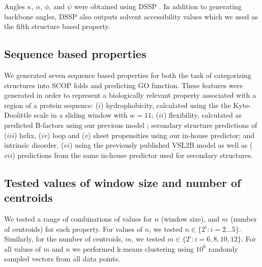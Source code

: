 Angles $\kappa$, $\alpha$, $\phi$, and $\psi$ were obtained using DSSP \citep{Kabsch1983}.  In addition to generating backbone angles, DSSP also outputs solvent accessibility values which we used as the fifth structure based property.

\subsection{Sequence based properties}

We generated seven sequence based properties for both the task of categorizing structures into SCOP folds and predicting GO function.  These features were generated in order to represent a biologically relevant property associated with a region of a protein sequence: ($i$) hydrophobicity, calculated using the the Kyte-Doolittle scale \citep{Kyte1982} in a sliding window with $w=11$; ($ii$) flexibility, calculated as predicted B-factors using our previous model \citep{radivojac2004protein}; secondary structure predictions of ($iii$) helix, ($iv$) loop and ($v$) sheet propensities using our in-house predictor; and intrinsic disorder, ($vi$) using the previously published VSL2B model \citep{Peng2006} as well as ($vii$) predictions from the same in-house predictor used for secondary structures. 

\subsection{Tested values of window size and number of centroids}
We tested a range of combinations of values for $n$ (window size), and $m$ (number of centroids) for each property.  For values of $n$, we tested $n\in \{2^{i}:i=2\dots 5\}$.  Similarly, for the number of centroids, $m$, we tested $m\in\{2^{i}:i=6,8,10,12\}$. For all values of $m$ and $n$ we performed k-means clustering using $10^6$ randomly sampled vectors from all data points.

